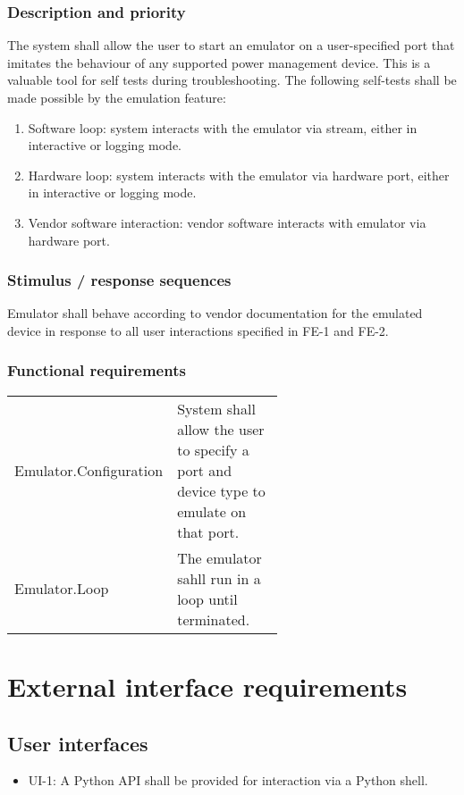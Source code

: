 \documentclass[pdftex,oneside,12pt,a4paper]{book}
\begin{document}
\subsubsection{Description and priority}
The system shall allow the user to start an emulator on a user-specified port that imitates the behaviour of any supported power management device.  This is a valuable tool for self tests during troubleshooting. The following self-tests shall be made possible by the emulation feature:
\begin{enumerate}
\item Software loop: system interacts with the emulator via stream, either in interactive or logging mode.
\item Hardware loop: system interacts with the emulator via hardware port, either in interactive or logging mode.
\item Vendor software interaction: vendor software interacts with emulator via hardware port.
\end{enumerate}

\subsubsection{Stimulus / response sequences}
Emulator shall behave according to vendor documentation for the emulated device in response to all user interactions specified in FE-1 and FE-2.

\subsubsection{Functional requirements}
\begin{tabular}{lp{0.6\linewidth}}
Emulator.Configuration & System shall allow the user to specify a port and device type to emulate on that port.\\
Emulator.Loop & The emulator sahll run in a loop until terminated.\\
\end{tabular}

\section{External interface requirements}
\subsection{User interfaces}
\begin{itemize}
\item UI-1: A Python API shall be provided for interaction via a Python shell.
\end{itemize}
\end{document}
